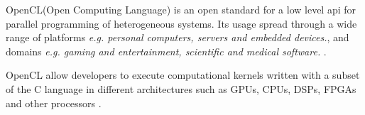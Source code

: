 \par{OpenCL(Open Computing Language) is an open standard for a low level api for parallel programming of heterogeneous systems. 
    Its usage spread through a wide range of platforms \emph{e.g. personal computers, servers and embedded devices.}, and domains 
    \emph{e.g. gaming and entertainment, scientific and medical software.} \cite{khronos} \cite{nvidia_opencl}.}

\par{OpenCL allow developers to execute computational kernels written with a subset of the C language in different architectures 
    \cite{nvidia_opencl} such as GPUs, CPUs, DSPs, FPGAs and other processors \cite{wikipedia_opencl}.}
